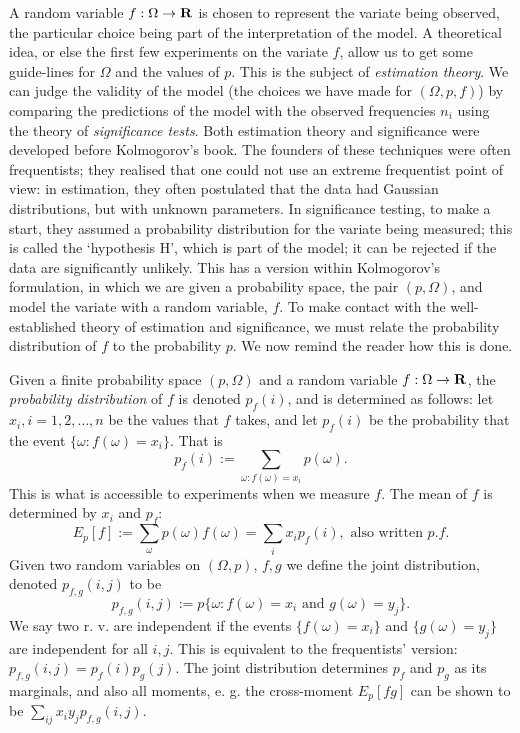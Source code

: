 \documentclass[12pt]{article}
\begin{document}
A random variable $f:\Omega
\rightarrow{\bf R}$ is chosen to
represent the variate being observed, the particular choice being
part of the interpretation of the model. A theoretical idea, or else
the first few experiments on the variate $f$, allow us to get some
guide-lines for $\Omega$ and
the values of $p$. This is the subject of {\em estimation
theory}. We can judge the validity of the model (the choices we have made
for $(\Omega,p,f)$) by comparing the predictions of the model with the
observed frequencies $n_i$
using the theory of {\em significance tests}. Both estimation theory and
significance were developed before Kolmogorov's book. The
founders of these techniques were often frequentists; they realised
that one could not use an extreme frequentist
point of view: in estimation, they often postulated that the data had
Gaussian distributions, but with unknown parameters. In significance
testing, to make a start, they assumed a probability distribution
for the variate being measured; this is called the `hypothesis H',
which is part of the model; it can be rejected
if the data are significantly unlikely. This
has a version within Kolmogorov's formulation, in which we are given a
probability space, the pair $(p,\Omega)$, and model the variate with
a random variable, $f$.
To make contact with the well-established theory of estimation
and significance, we must relate the probability distribution of $f$
to the probability $p$. We now remind the reader how this is done.

Given a finite probability space $(p,\Omega)$ and a
random variable $f:\Omega\rightarrow {\bf R}$, the {\em probability
distribution} of $f$ is denoted $p_f(i)$, and is determined as follows:
let $x_i, i=1,2,\ldots,n$ be the values that
$f$ takes, and let $p_f(i)$ be the probability that the event $\{\omega:f
(\omega)=x_i\}$. That is
\begin{equation}
p_f(i):=\sum_{\omega:f(\omega)=x_i}p(\omega).
\end{equation}
This is what is accessible to experiments when we measure $f$.
The mean of $f$ is determined by $x_i$ and $p_f$:
\begin{equation}
E_p[f]:=\sum_\omega p(\omega)f(\omega)=\sum_i x_ip_f(i),
\mbox{ also written }p.f.
\label{mean}
\end{equation}
Given two random variables on $(\Omega,p)$, $f,g$ we define the joint
distribution, denoted $p_{f,g}(i,j)$ to be
\begin{equation}
p_{f,g}(i,j):=p\{\omega:f(\omega)=x_i\mbox{ and }g(\omega)=y_j\}.
\end{equation}
We say two r. v. are independent if the events $\{f(\omega)=x_i\}$ and
$\{g(\omega)=y_j\}$ are independent for all $i,j$. This is equivalent to
the frequentists' version: $p_{f,g}(i,j)=p_f(i)p_g(j)$.
The joint distribution determines $p_f$ and $p_g$ as its marginals,
and also all moments, e. g. the cross-moment $E_p[fg]$
can be shown to be $\sum_{ij}x_iy_jp_{f,g}(i,j).$
\end{document}
